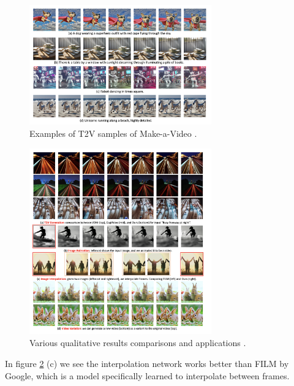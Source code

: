 \begin{figure}
    \centering
    \includegraphics[width=0.7\textwidth]{images/make_a_video/examples.png}
    \caption{Examples of T2V samples of Make-a-Video \cite{make_a_video}.}
    \label{fig:make_a_video_examples}
\end{figure}

\begin{figure}
    \centering
    \includegraphics[width=0.7\textwidth]{images/make_a_video/examples2.png}
    \caption{Various qualitative results comparisons and applications \cite{make_a_video}.}
    \label{fig:make_a_video_examples2}
\end{figure}

In figure \ref{fig:make_a_video_examples2} (c) we see the interpolation network works better than FILM \cite{film} by Google, which is a model specifically learned to interpolate between frames.


